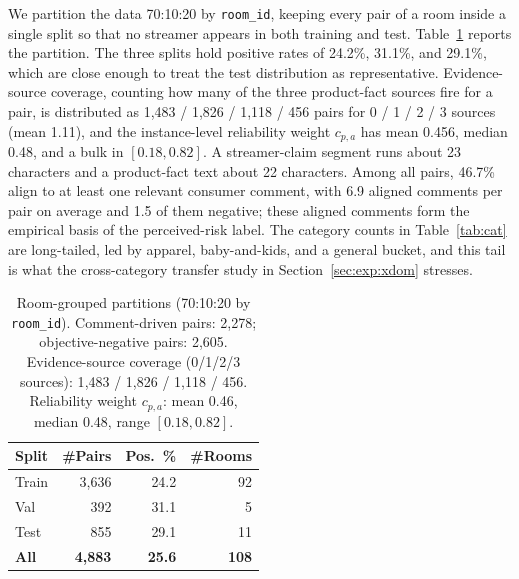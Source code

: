\documentclass[11pt]{article}
\newcommand{\best}[1]{\textbf{#1}}
\begin{document}
We partition the data 70:10:20 by \texttt{room\_id}, keeping every pair of a
room inside a single split so that no streamer appears in both training and
test. Table~\ref{tab:data} reports the partition. The three splits hold
positive rates of 24.2\%, 31.1\%, and 29.1\%, which are close enough to treat
the test distribution as representative. Evidence-source coverage, counting how
many of the three product-fact sources fire for a pair, is distributed as
1{,}483 / 1{,}826 / 1{,}118 / 456 pairs for 0 / 1 / 2 / 3 sources (mean 1.11),
and the instance-level reliability weight $c_{p,a}$ has mean 0.456, median
0.48, and a bulk in $[0.18, 0.82]$. A streamer-claim segment runs about 23
characters and a product-fact text about 22 characters. Among all pairs,
46.7\% align to at least one relevant consumer comment, with 6.9 aligned
comments per pair on average and 1.5 of them negative; these aligned comments
form the empirical basis of the perceived-risk label. The category counts in
Table~\ref{tab:cat} are long-tailed, led by apparel, baby-and-kids, and a
general bucket, and this tail is what the cross-category transfer study in
Section~\ref{sec:exp:xdom} stresses.

\begin{table}[t]
\centering\small
\setlength{\tabcolsep}{8pt}
\begin{tabular}{lrrr}
\toprule
\textbf{Split} & \textbf{\#Pairs} & \textbf{Pos.\ \%} & \textbf{\#Rooms} \\
\midrule
Train & 3{,}636 & 24.2 & 92 \\
Val   & 392     & 31.1 & 5  \\
Test  & 855     & 29.1 & 11 \\
\midrule
\textbf{All} & \best{4{,}883} & \best{25.6} & \best{108} \\
\bottomrule
\end{tabular}
\caption{Room-grouped partitions (70:10:20 by \texttt{room\_id}).
Comment-driven pairs: 2{,}278; objective-negative pairs: 2{,}605.
Evidence-source coverage (0/1/2/3 sources): 1{,}483 / 1{,}826 / 1{,}118 / 456.
Reliability weight $c_{p,a}$: mean 0.46, median 0.48, range $[0.18,0.82]$.}
\label{tab:data}
\end{table}
\end{document}
